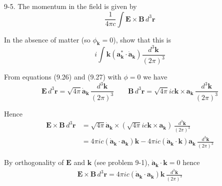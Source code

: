 \documentclass[12pt]{article}
\begin{document}
9-5.
The momentum in the field is given by
\begin{equation*}
\frac{1}{4\pi c}\int
\mathbf E\times\mathbf B\,d^3\mathbf r
\end{equation*}

In the absence of matter (so $\phi_{\mathbf k}=0$),
show that this is
\begin{equation*}
i\int\mathbf k\left(\mathbf a_{\mathbf k}^*\cdot\dot{\mathbf a}_{\mathbf k}\right)
\frac{d^3\mathbf k}{(2\pi)^3}
\end{equation*}

From equations (9.26) and (9.27) with $\phi=0$ we have
\begin{equation*}
\mathbf E\,d^3\mathbf r=\sqrt{4\pi}\dot{\mathbf a}_{\mathbf k}\,\frac{d^3\mathbf k}{(2\pi)^3}
\qquad
\mathbf B\,d^3\mathbf r=\sqrt{4\pi}ic\mathbf k\times\mathbf a_{\mathbf k}\,\frac{d^3\mathbf k}{(2\pi)^3}
\end{equation*}

Hence
\begin{align*}
\mathbf E\times\mathbf B\,d^3\mathbf r
&=\sqrt{4\pi}\dot{\mathbf a}_{\mathbf k}
\times\left(\sqrt{4\pi}ic\mathbf k\times\mathbf a_{\mathbf k}\right)
\,\frac{d^3\mathbf k}{(2\pi)^3}
\\
&=4\pi ic(\dot{\mathbf a}_{\mathbf k}\cdot\mathbf a_{\mathbf k})\mathbf k
-4\pi ic(\dot{\mathbf a}_{\mathbf k}\cdot\mathbf k)\mathbf a_{\mathbf k}
\,\frac{d^3\mathbf k}{(2\pi)^3}
\end{align*}

By orthogonality of $\mathbf E$ and $\mathbf k$ (see problem 9-1),
$\dot{\mathbf a}_{\mathbf k}\cdot\mathbf k=0$ hence
\begin{align*}
\mathbf E\times\mathbf B\,d^3\mathbf r
=4\pi ic(\dot{\mathbf a}_{\mathbf k}\cdot\mathbf a_{\mathbf k})\mathbf k\,\frac{d^3\mathbf k}{(2\pi)^3}
\end{align*}
\end{document}
